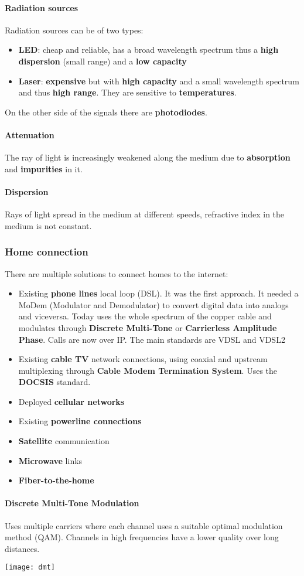 \paragraph{Radiation sources} Radiation sources can be of two types:
\begin{itemize}
	\item \textbf{LED}: cheap and reliable, has a broad wavelength spectrum thus a \textbf{high dispersion} (small range) and a \textbf{low capacity}
	\item \textbf{Laser}: \textbf{expensive} but with \textbf{high capacity} and a small wavelength spectrum and thus \textbf{high range}. They  are sensitive to \textbf{temperatures}.
\end{itemize}
On the other side of the signals there are \textbf{photodiodes}.

\paragraph{Attenuation} The ray of light is increasingly weakened along the medium due to \textbf{absorption} and \textbf{impurities} in it.

\paragraph{Dispersion} Rays of light spread in the medium at different speeds, refractive index in the medium is not constant.

\subsubsection{Home connection}
There are multiple solutions to connect homes to the internet:
\begin{itemize}
	\item Existing \textbf{phone lines} local loop (DSL). It was the first approach. It needed a MoDem (Modulator and Demodulator) to convert digital data into analogs and viceversa. Today uses the whole spectrum of the copper cable and modulates through \textbf{Discrete Multi-Tone} or \textbf{Carrierless Amplitude Phase}. Calls are now over IP. The main standards are VDSL and VDSL2
	\item Existing \textbf{cable TV} network connections, using coaxial and upstream multiplexing through \textbf{Cable Modem Termination System}. Uses the \textbf{DOCSIS} standard.
	\item Deployed \textbf{cellular networks}
	\item Existing \textbf{powerline connections}
	\item \textbf{Satellite} communication
	\item \textbf{Microwave} links
	\item \textbf{Fiber-to-the-home}
\end{itemize}

\paragraph{Discrete Multi-Tone Modulation}
Uses multiple carriers where each channel uses a suitable optimal modulation method (QAM). Channels in high frequencies have a lower quality over long distances.
\begin{center}
	\texttt{[image: dmt]}
\end{center}